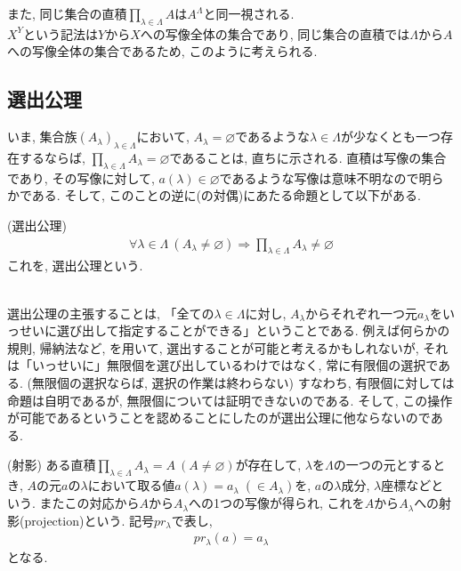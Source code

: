 \documentclass[a4j]{jsarticle}
\begin{document}
 また, 同じ集合の直積$\prod_{\lambda \in \Lambda}A$は$A^\Lambda$と同一視される. \\
$X^Y$という記法は$Y$から$X$への写像全体の集合であり, 同じ集合の直積では$\Lambda$から$A$への写像全体の集合であるため, このように考えられる.

\subsection{選出公理}

いま, 集合族$(A_\lambda)_{\lambda \in \Lambda}$において, $A_\lambda = \varnothing$であるような$\lambda \in \Lambda$が少なくとも一つ存在するならば, $\prod_{\lambda \in \Lambda}A_\lambda = \varnothing$であることは, 直ちに示される. 直積は写像の集合であり, その写像に対して, $a(\lambda) \in \varnothing$であるような写像は意味不明なので明らかである. そして, このことの逆に(の対偶)にあたる命題として以下がある. \\

\begin{itembox}[l]{ (選出公理)}
	\begin{align}
		\label{ac}
		\forall \lambda \in \Lambda\:(A_\lambda \neq \varnothing) \Rightarrow \prod_{\lambda \in \Lambda}A_\lambda \neq \varnothing \tag{AC}
	\end{align}
	これを, 選出公理という.
\end{itembox}\\

 選出公理の主張することは, 「全ての$\lambda \in \Lambda$に対し, $A_\lambda$からそれぞれ一つ元$a_\lambda$をいっせいに選び出して指定することができる」ということである. 例えば何らかの規則, 帰納法など, を用いて, 選出することが可能と考えるかもしれないが, それは「いっせいに」無限個を選び出しているわけではなく, 常に有限個の選択である. (無限個の選択ならば, 選択の作業は終わらない) すなわち, 有限個に対しては命題は自明であるが, 無限個については証明できないのである. そして, この操作が可能であるということを認めることにしたのが選出公理に他ならないのである.

\begin{itembox}[l]{ (射影)}
	ある直積$\prod_{\lambda \in \Lambda}A_\lambda = A\:(A \neq \varnothing)$が存在して, $\lambda$を$\Lambda$の一つの元とするとき, $A$の元$a$の$\lambda$において取る値$a(\lambda)=a_\lambda\;(\in A_\lambda)$を, $a$の$\lambda$成分, $\lambda$座標などという. またこの対応から$A$から$A_\lambda$への1つの写像が得られ, これを$A$から$A_\lambda$への射影(projection)という. 記号$pr_\lambda$で表し,
	\begin{align}
		pr_\lambda(a) = a_\lambda
	\end{align}
	となる.
\end{itembox}
\end{document}

